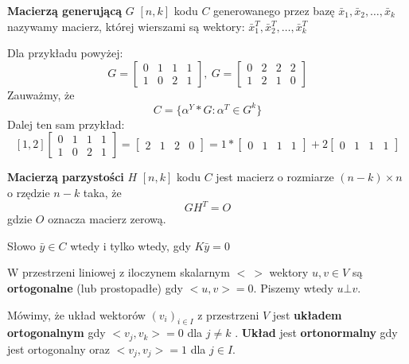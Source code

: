 \begin{definition}\textbf{Macierzą generującą} $G$ $[n,k]$ kodu $C$ generowanego przez bazę $\bar{x}_1,\bar{x}_2,\dots ,\bar{x}_k$ nazywamy macierz, której wierszami są wektory: $\bar{x}_1^T,\bar{x}_2^T,\dots ,\bar{x}_k^T$

Dla przykładu powyżej:
$$G=\begin{bmatrix}
0&1&1&1\\
1&0&2&1
\end{bmatrix},\ G=\begin{bmatrix}
0&2&2&2\\
1&2&1&0
\end{bmatrix}$$
Zauważmy, że $$C=\{\alpha ^Y*G:\alpha ^T\in G^k\}$$
Dalej ten sam przykład:
$$[ 1, 2 ] \begin{bmatrix}
0&1&1&1\\
1&0&2&1
\end{bmatrix}=\begin{bmatrix}
2&1&2&0
\end{bmatrix}=1*\begin{bmatrix}
0&1&1&1
\end{bmatrix}+2\begin{bmatrix}
0&1&1&1
\end{bmatrix}$$
\end{definition}



\begin{definition}
\textbf{Macierzą parzystości} $H$ $[n,k]$ kodu $C$ jest macierz o rozmiarze $(n-k)\times n$ o rzędzie $n-k$ taka, że $$GH^T=O$$ gdzie $O$ oznacza macierz zerową. 
\end{definition}
\begin{fact*}
Słowo $\bar{y}\in C$ wtedy i tylko wtedy, gdy $K\bar{y}=0$
\end{fact*}

\begin{definition}[Ortogonalność]
W przestrzeni liniowej z iloczynem skalarnym $<\ >$ wektory $u,v\in V$ są \textbf{ortogonalne} (lub prostopadłe) gdy $<u,v>=0$. Piszemy wtedy $u\bot v$.
\end{definition}

\begin{definition}
Mówimy, że układ wektorów $(v_i)_{i\in I}$ z przestrzeni $V$ jest \textbf{układem ortogonalnym} gdy $<v_j, v_k> = 0$ dla $j\neq k$ . \textbf{Układ} jest \textbf{ortonormalny} gdy jest ortogonalny oraz $<v_j
, v_j> = 1$ dla $j\in I$.
\end{definition}


